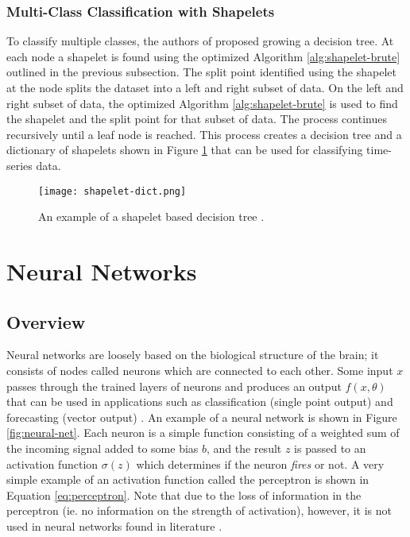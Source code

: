 \subsubsection{Multi-Class Classification with Shapelets}
To classify multiple classes, the authors of \cite{yeTimeSeriesShapelets2009} proposed growing a decision tree. At each node a shapelet is found using the optimized Algorithm \ref{alg:shapelet-brute} outlined in the previous subsection. The split point identified using the shapelet at the node splits the dataset into a left and right subset of data. On the left and right subset of data, the optimized Algorithm \ref{alg:shapelet-brute} is used to find the shapelet and the split point for that subset of data. The process continues recursively until a leaf node is reached. This process creates a decision tree and a dictionary of shapelets shown in Figure \ref{fig:shapelet-dictionary} that can be used for classifying time-series data.

\begin{figure}[ht]
    \centering
    \texttt{[image: shapelet-dict.png]}
    \caption{An example of a shapelet based decision tree \cite{yeTimeSeriesShapelets2009}.}
    \label{fig:shapelet-dictionary}
\end{figure}

\section{Neural Networks}
\subsection{Overview}
Neural networks are loosely based on the biological structure of the brain; it consists of nodes called neurons which are connected to each other. Some input $x$ passes through the trained layers of neurons and produces an output $f(x,\theta)$ that can be used in applications such as classification (single point output) and forecasting (vector output) \cite{robertsPrinciplesDeepLearning2022b}. An example of a neural network is shown in Figure \ref{fig:neural-net}. Each neuron is a simple function consisting of a weighted sum of the incoming signal added to some bias $b$, and the result $z$ is passed to an activation function $\sigma(z)$ which determines if the neuron \textit{fires} or not. A very simple example of an activation function called the perceptron is shown in Equation \ref{eq:perceptron}. Note that due to the loss of information in the perceptron (ie. no information on the strength of activation), however, it is not used in neural networks found in literature \cite{robertsPrinciplesDeepLearning2022b}.

